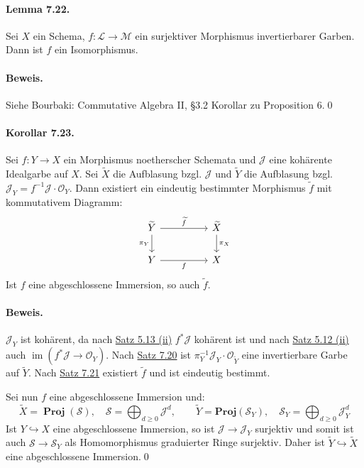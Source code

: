 \paragraph{Lemma 7.22.}\label{7.22} Sei $X$ ein Schema, $f:\mathcal{L}\to\mathcal{M}$ ein surjektiver Morphismus invertierbarer Garben. Dann ist $f$ ein Isomorphismus.

\paragraph{Beweis.} Siehe Bourbaki: Commutative Algebra II, §3.2 Korollar zu Proposition 6.\qed

\paragraph{Korollar 7.23.}\label{7.23} Sei $f:Y\to X$ ein Morphismus noetherscher Schemata und $\mathcal{J}$ eine kohärente Idealgarbe auf $X$. Sei $\widetilde{X}$ die Aufblasung bzgl. $\mathcal{J}$ und $\widetilde{Y}$ die Aufblasung bzgl. $\mathcal{J}_Y=f^{-1}\mathcal{J}\cdot\mathcal{O}_Y$. Dann existiert ein eindeutig bestimmter Morphismus $\widetilde{f}$ mit kommutativem Diagramm:
\[\begin{tikzcd}
\widetilde{Y}\ar[rr, "\widetilde{f}"]\dar["\pi_Y"'] && \widetilde{X}\dar["\pi_X"]\\
Y\ar[rr, "f"'] && X
\end{tikzcd}\]
Ist $f$ eine abgeschlossene Immersion, so auch $\widetilde{f}$.

\paragraph{Beweis.} $\mathcal{J}_Y$ ist kohärent, da nach \hyperref[5.13]{Satz 5.13 (ii)} $f^\ast\mathcal{J}$ kohärent ist und nach \hyperref[5.12]{Satz 5.12 (ii)} auch $\operatorname{im}(f^\ast\mathcal{J}\to\mathcal{O}_Y)$. Nach \hyperref[7.20]{Satz 7.20} ist $\pi_Y^{-1}\mathcal{J}_Y\cdot\mathcal{O}_{\widetilde{Y}}$ eine invertierbare Garbe auf $\widetilde{Y}$. Nach \hyperref[7.21]{Satz 7.21} existiert $\widetilde{f}$ und ist eindeutig bestimmt.

Sei nun $f$ eine abgeschlossene Immersion und:
\[\widetilde{X}=\operatorname{\mathbf{Proj}}(\mathcal{S}),\quad \mathcal{S}=\bigoplus_{d\geq 0}\mathcal{J}^d,\qquad\widetilde{Y}=\mathbf{Proj}(\mathcal{S}_Y),\quad\mathcal{S}_Y=\bigoplus_{d\geq 0}\mathcal{J}_Y^d \]
Ist $Y\hookrightarrow X$ eine abgeschlossene Immersion, so ist $\mathcal{J}\to\mathcal{J}_Y$ surjektiv und somit ist auch $\mathcal{S}\to\mathcal{S}_Y$ als Homomorphismus graduierter Ringe surjektiv. Daher ist $\widetilde{Y}\hookrightarrow\widetilde{X}$ eine abgeschlossene Immersion.\qed

